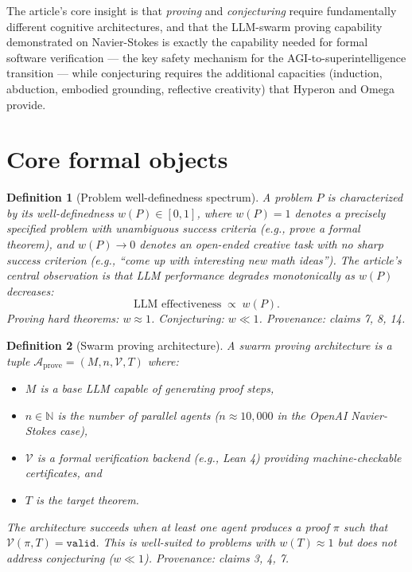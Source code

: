 \documentclass[11pt]{article}
\newtheorem{definition}{Definition}
\newcommand{\N}{\mathbb{N}}
\newcommand{\cA}{\mathcal{A}}
\newcommand{\cV}{\mathcal{V}}
\begin{document}
The article's core insight is that \emph{proving} and \emph{conjecturing}
require fundamentally different cognitive architectures, and that the
LLM-swarm proving capability demonstrated on Navier-Stokes is exactly the
capability needed for formal software verification --- the key safety
mechanism for the AGI-to-superintelligence transition --- while
conjecturing requires the additional capacities (induction, abduction,
embodied grounding, reflective creativity) that Hyperon and Omega provide.

\section{Core formal objects}

\begin{definition}[Problem well-definedness spectrum]\label{def:welldef}
A problem $P$ is characterized by its \emph{well-definedness} $w(P) \in [0,1]$,
where $w(P) = 1$ denotes a precisely specified problem with unambiguous
success criteria (e.g., prove a formal theorem), and $w(P) \to 0$ denotes
an open-ended creative task with no sharp success criterion (e.g., ``come up
with interesting new math ideas'').  The article's central observation is
that LLM performance degrades monotonically as $w(P)$ decreases:
\[
  \text{LLM effectiveness} \;\propto\; w(P).
\]
Proving hard theorems: $w \approx 1$.  Conjecturing: $w \ll 1$.
\emph{Provenance: claims 7, 8, 14.}
\end{definition}

\begin{definition}[Swarm proving architecture]\label{def:swarm}
A \emph{swarm proving architecture} is a tuple
$\cA_{\mathrm{prove}} = (M, n, \cV, T)$ where:
\begin{itemize}
  \item $M$ is a base LLM capable of generating proof steps,
  \item $n \in \N$ is the number of parallel agents ($n \approx 10{,}000$
    in the OpenAI Navier-Stokes case),
  \item $\cV$ is a formal verification backend (e.g., Lean 4) providing
    machine-checkable certificates, and
  \item $T$ is the target theorem.
\end{itemize}
The architecture succeeds when at least one agent produces a proof $\pi$
such that $\cV(\pi, T) = \texttt{valid}$.  This is well-suited to
problems with $w(T) \approx 1$ but does not address conjecturing ($w \ll 1$).
\emph{Provenance: claims 3, 4, 7.}
\end{definition}
\end{document}
